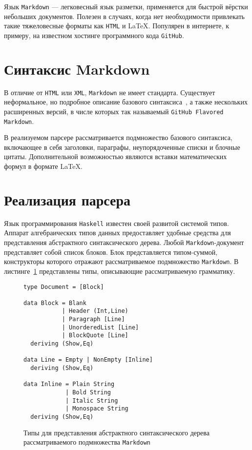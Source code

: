 Язык \lstinline{Markdown} --- легковесный язык разметки, применяется для быстрой
вёрстки небольших документов. Полезен в случаях, когда нет необходимости привлекать
такие тяжеловесные форматы как \lstinline{HTML} и \LaTeX. Популярен в
интернете, к примеру, на известном хостинге программного кода
\lstinline{GitHub}.

\section{Синтаксис Markdown}

В отличие от \lstinline{HTML} или \lstinline{XML}, \lstinline{Markdown} не имеет
стандарта. Существует неформальное, но подробное описание базового
синтаксиса~\cite{markdownSyntax}, а также нескольких расширенных версий, в
числе которых так называемый \lstinline{GitHub Flavored Markdown}.

В реализуемом парсере рассматривается подмножество базового синтаксиса,
включающее в себя заголовки, параграфы, неупорядоченные списки и блочные цитаты.
Дополнительной возможностью являются вставки математических формул в формате
\LaTeX.

\section{Реализация парсера}

Язык программирования \lstinline{Haskell} известен своей развитой системой
типов. Аппарат алгебраических типов данных предоставляет удобные средства для
представления абстрактного синтаксического дерева. Любой 
\lstinline{Markdown}-документ представляет собой список блоков. Блок
представляется типом-суммой, конструкторы которого отражают рассматриваемое
подмножество \lstinline{Markdown}. В листинге~\ref{listing:MarkdownADT}
представлены типы, описывающие рассматриваемую грамматику.

\begin{figure}[t]
\begin{lstlisting}
type Document = [Block]

data Block = Blank
           | Header (Int,Line)
           | Paragraph [Line]
           | UnorderedList [Line]
           | BlockQuote [Line]
  deriving (Show,Eq)

data Line = Empty | NonEmpty [Inline]
  deriving (Show,Eq)

data Inline = Plain String
            | Bold String
            | Italic String
            | Monospace String
  deriving (Show,Eq)
\end{lstlisting}
\caption{Типы для представления абстрактного синтаксического дерева 
рассматриваемого подмножества \lstinline{Markdown}}
\label{listing:MarkdownADT}
\end{figure}

